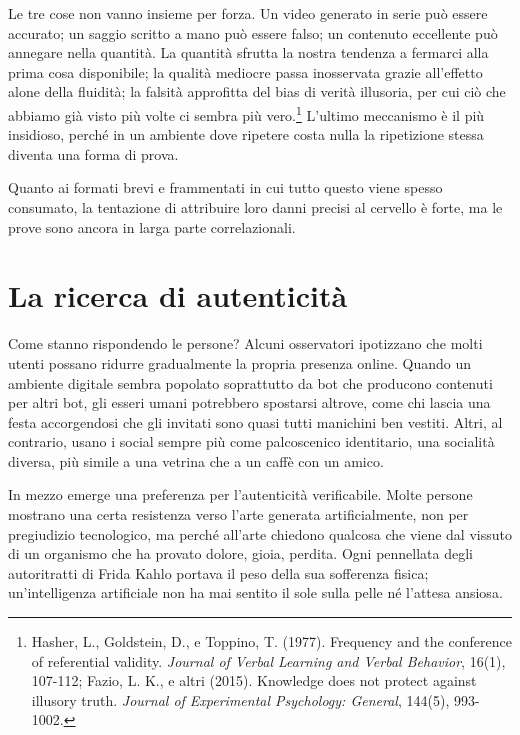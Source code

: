 Le tre cose non vanno insieme per forza. Un video generato in serie può essere accurato; un saggio scritto a mano può essere falso; un contenuto eccellente può annegare nella quantità. La quantità sfrutta la nostra tendenza a fermarci alla prima cosa disponibile; la qualità mediocre passa inosservata grazie all'effetto alone della fluidità; la falsità approfitta del bias di verità illusoria, per cui ciò che abbiamo già visto più volte ci sembra più vero.\footnote{Hasher, L., Goldstein, D., e Toppino, T. (1977). Frequency and the conference of referential validity. \textit{Journal of Verbal Learning and Verbal Behavior}, 16(1), 107-112; Fazio, L. K., e altri (2015). Knowledge does not protect against illusory truth. \textit{Journal of Experimental Psychology: General}, 144(5), 993-1002.} L'ultimo meccanismo è il più insidioso, perché in un ambiente dove ripetere costa nulla la ripetizione stessa diventa una forma di prova.


Quanto ai formati brevi e frammentati in cui tutto questo viene spesso consumato, la tentazione di attribuire loro danni precisi al cervello è forte, ma le prove sono ancora in larga parte correlazionali.

\section{La ricerca di autenticità}

Come stanno rispondendo le persone? Alcuni osservatori ipotizzano che molti utenti possano ridurre gradualmente la propria presenza online. Quando un ambiente digitale sembra popolato soprattutto da bot che producono contenuti per altri bot, gli esseri umani potrebbero spostarsi altrove, come chi lascia una festa accorgendosi che gli invitati sono quasi tutti manichini ben vestiti. Altri, al contrario, usano i social sempre più come palcoscenico identitario, una socialità diversa, più simile a una vetrina che a un caffè con un amico.


In mezzo emerge una preferenza per l'autenticità verificabile. Molte persone mostrano una certa resistenza verso l'arte generata artificialmente, non per pregiudizio tecnologico, ma perché all'arte chiedono qualcosa che viene dal vissuto di un organismo che ha provato dolore, gioia, perdita. Ogni pennellata degli autoritratti di Frida Kahlo portava il peso della sua sofferenza fisica; un'intelligenza artificiale non ha mai sentito il sole sulla pelle né l'attesa ansiosa.

